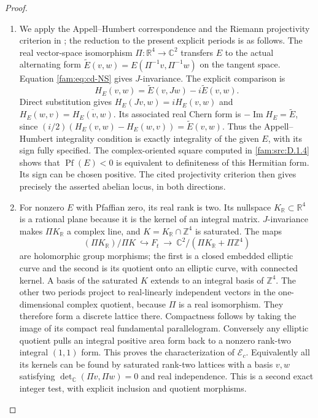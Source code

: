 \begin{proof}
\begin{enumerate}[label=\arabic*.,leftmargin=*]
\item \label{app:rederive:fam-src-D.1.6}
We apply the Appell--Humbert correspondence and the Riemann projectivity
criterion in \cite[Theorem 4.1, p.~1, and Theorem 4.4, p.~3]{Schnell19}; the reduction to the
present explicit periods is as follows. The real vector-space isomorphism
$\Pi:\mathbb R^4\to\mathbb C^2$ transfers $E$ to the actual alternating
form $\widetilde E(v,w)=E(\Pi^{-1}v,\Pi^{-1}w)$ on the tangent space.
Equation \eqref{fam:eq:cd-NS} gives $J$-invariance. The explicit comparison is
\[
 H_E(v,w)=\widetilde E(v,Jw)-i\widetilde E(v,w).
\]
Direct substitution gives $H_E(Jv,w)=iH_E(v,w)$ and
$H_E(w,v)=\overline{H_E(v,w)}$. Its associated real Chern form is
$-\operatorname{Im}H_E=\widetilde E$, since
$(i/2)(H_E(v,w)-H_E(w,v))=\widetilde E(v,w)$.
Thus the Appell--Humbert integrality condition is exactly integrality
of the given $E$, with its sign fully specified. The complex-oriented square computed in \ref{fam:src:D.1.4} shows that
$\operatorname{Pf}(E)<0$ is equivalent to definiteness of this Hermitian
form. Its sign can be chosen positive. The cited projectivity criterion
then gives precisely the asserted abelian locus, in both directions.

\item For nonzero $E$ with Pfaffian zero, its real rank is two. Its nullspace
$K_{\mathbb R}\subset\mathbb R^4$ is a rational plane because it is the
kernel of an integral matrix. $J$-invariance makes $\Pi K_{\mathbb R}$ a
complex line, and $K=K_{\mathbb R}\cap\mathbb Z^4$ is saturated. The maps
\[
 (\Pi K_{\mathbb R})/\Pi K\ \hookrightarrow F_t
 \ \longrightarrow\
 \mathbb C^2/(\Pi K_{\mathbb R}+\Pi\mathbb Z^4)
\]
are holomorphic group morphisms; the first is a closed embedded elliptic
curve and the second is its quotient onto an elliptic curve, with
connected kernel. A basis of the saturated $K$ extends to an integral basis of $\mathbb Z^4$.
The other two periods project to real-linearly independent vectors in the
one-dimensional complex quotient, because $\Pi$ is a real isomorphism.
They therefore form a discrete lattice there. Compactness follows by
taking the image of its compact real fundamental parallelogram. Conversely any elliptic quotient
pulls an integral positive area form back to a nonzero rank-two integral
$(1,1)$ form. This proves the characterization of $\mathcal E_c$.
Equivalently all its kernels can be found by saturated rank-two lattices
with a basis $v,w$ satisfying
$\det_{\mathbb C}(\Pi v,\Pi w)=0$ and real independence. This is a second
exact integer test, with explicit inclusion and quotient morphisms.


\end{enumerate}
\end{proof}
